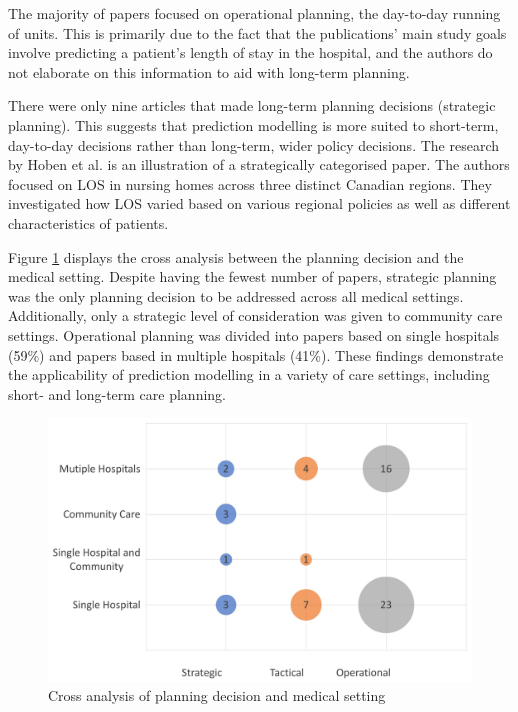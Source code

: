 \documentclass[../thesis.tex]{subfiles}
\begin{document}
The majority of papers focused on operational planning, the day-to-day running of units. This is primarily due to the fact that the publications' main study goals involve predicting a patient's length of stay in the hospital, and the authors do not elaborate on this information to aid with long-term planning. 

There were only nine articles that made long-term planning decisions (strategic planning). This suggests that prediction modelling is more suited to short-term, day-to-day decisions rather than long-term, wider policy decisions. The research by Hoben et al. \cite{Hoben2019} is an illustration of a strategically categorised paper. The authors focused on LOS in nursing homes across three distinct Canadian regions. They investigated how LOS varied based on various regional policies as well as different characteristics of patients.

Figure \ref{fig:lr2cross1} displays the cross analysis between the planning decision and the medical setting. Despite having the fewest number of papers, strategic planning was the only planning decision to be addressed across all medical settings. Additionally, only a strategic level of consideration was given to community care settings. Operational planning was divided into papers based on single hospitals (59\%) and papers based in multiple hospitals (41\%). These findings demonstrate the applicability of prediction modelling in a variety of care settings, including short- and long-term care planning.

\begin{figure}[h!]
    \centering
    \includegraphics[scale=0.6]{Chapters/Chapter2/Figures2/decmed1.pdf}
    \caption{Cross analysis of planning decision and medical setting}
    \label{fig:lr2cross1}
\end{figure}
\end{document}
